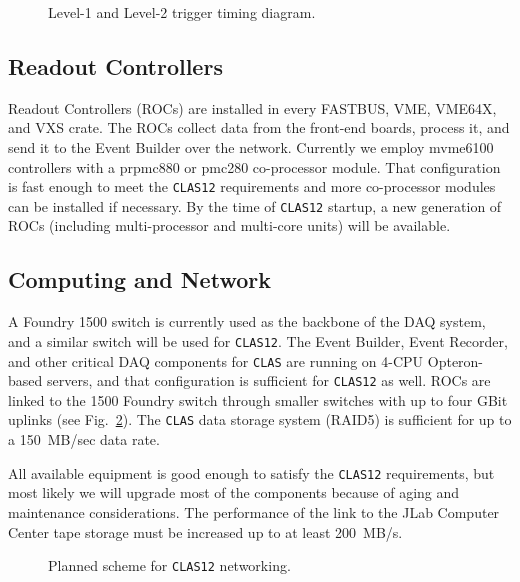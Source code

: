 \begin{figure}[ht]
\vspace{12.0cm}
\caption{\small{Level-1 and Level-2 trigger timing diagram.}}
\label{fig:TRIGGER2} 
\end{figure}

\subsection{Readout Controllers}

Readout Controllers (ROCs) are installed in every FASTBUS, VME, VME64X, 
and VXS crate.  The ROCs collect data from the front-end boards, process it, 
and send it to the Event Builder over the network.  Currently we employ 
mvme6100 controllers with a prpmc880 or pmc280 co-processor module.  That 
configuration is fast enough to meet the {\tt CLAS12} requirements and more 
co-processor modules can be installed if necessary.  By the time of 
{\tt CLAS12} startup, a new generation of ROCs (including multi-processor and 
multi-core units) will be available.

\subsection{Computing and Network}

A Foundry 1500 switch is currently used as the backbone of the DAQ system, 
and a similar switch will be used for {\tt CLAS12}.  The Event Builder, 
Event Recorder, and other critical DAQ components for {\tt CLAS} are 
running on 4-CPU Opteron-based servers, and that configuration is sufficient 
for {\tt CLAS12} as well.  ROCs are linked to the 1500 Foundry switch
through smaller switches with up to four GBit uplinks (see Fig.~\ref{fig:NET1}).  
The {\tt CLAS} data storage system (RAID5) is sufficient for up to a 150~MB/sec 
data rate.

All available equipment is good enough to satisfy the {\tt CLAS12} 
requirements, but most likely we will upgrade most of the components 
because of aging and maintenance considerations.  The performance of the 
link to the JLab Computer Center tape storage must be increased
up to at least 200~MB/s.

\begin{figure}[ht]
\vspace{12.0cm}
\caption{\small{Planned scheme for {\tt CLAS12} networking.}}
\label{fig:NET1} 
\end{figure}
